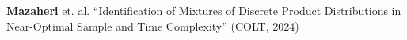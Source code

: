 \documentclass[preview]{standalone}
\begin{document}
\begin{center}
\textbf{Mazaheri} et. al.  ``Identification of Mixtures of Discrete Product Distributions \newline in Near-Optimal Sample and Time Complexity'' (COLT, 2024)
\end{center}
\end{document}
